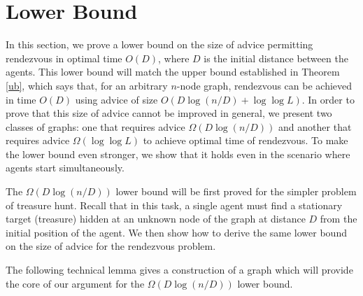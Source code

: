 \documentclass{llncs}
\begin{document}
\section{Lower Bound}

In this section, we prove a lower bound on the size of advice permitting rendezvous in optimal time $O(D)$, where $D$ is the initial distance between the agents. This lower bound will match the upper bound established in
Theorem \ref{ub}, which says that, for an arbitrary $n$-node graph, rendezvous can be achieved in time $O(D)$ using advice of size
 $O(D\log(n/D)+\log\log L)$. In order to prove that this size of advice cannot be improved in general, we present two classes of graphs: one that requires
 advice $\Omega(D\log(n/D))$ and another that requires advice $\Omega(\log\log L)$ to achieve optimal time of rendezvous. To make the lower bound even stronger, we show that it holds even in the scenario where agents start simultaneously. 
 
 The $\Omega(D\log(n/D))$  lower bound will be first proved for the simpler problem of treasure hunt. Recall that in this task,
 a single agent must find a stationary target (treasure) hidden at an unknown node of the graph at distance $D$ from the initial position of the agent. 
We then show how to derive the same lower bound on the size of advice for the rendezvous problem.
 
 The following technical lemma gives a construction of a graph which will provide the core of our argument for the $\Omega(D\log(n/D))$ lower bound.
\end{document}
